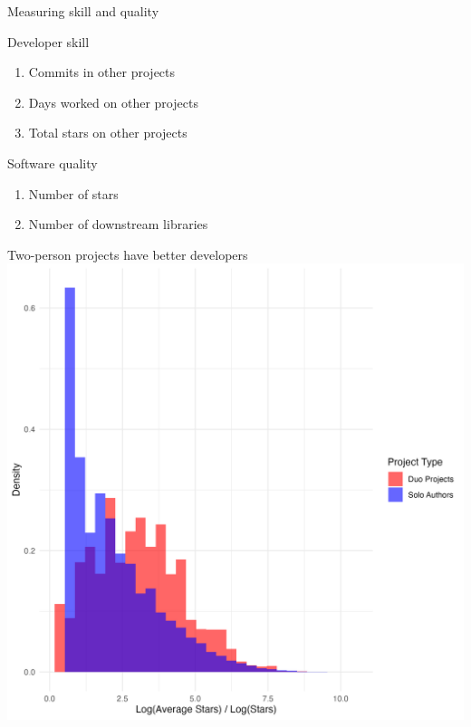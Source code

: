 \documentclass[
  ignorenonframetext,
  aspectratio=169,
]{beamer}
\providecommand{\tightlist}{%
  \setlength{\itemsep}{0pt}\setlength{\parskip}{0pt}}
\begin{document}
\begin{frame}{Measuring skill and quality}
\protect\hypertarget{measuring-skill-and-quality}{}
\begin{block}{Developer skill}
\protect\hypertarget{developer-skill-1}{}
\begin{enumerate}
\tightlist
\item
  Commits in other projects
\item
  Days worked on other projects
\item
  Total stars on other projects
\end{enumerate}
\end{block}

\begin{block}{Software quality}
\protect\hypertarget{software-quality}{}
\begin{enumerate}
\tightlist
\item
  Number of stars
\item
  Number of downstream libraries
\end{enumerate}
\end{block}
\end{frame}

\begin{frame}{Two-person projects have better developers}
\protect\hypertarget{two-person-projects-have-better-developers}{}
\includegraphics{figures/coder_quality_solo_duo.png}
\end{frame}
\end{document}

